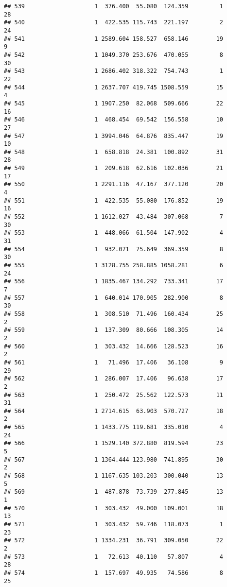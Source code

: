 \documentclass[
]{article}
\begin{document}
\begin{verbatim}
## 539                    1  376.400  55.080  124.359         1        28
## 540                    1  422.535 115.743  221.197         2        24
## 541                    1 2589.604 158.527  658.146        19         9
## 542                    1 1049.370 253.676  470.055         8        30
## 543                    1 2686.402 318.322  754.743         1        22
## 544                    1 2637.707 419.745 1508.559        15         4
## 545                    1 1907.250  82.068  509.666        22        16
## 546                    1  468.454  69.542  156.558        10        27
## 547                    1 3994.046  64.876  835.447        19        10
## 548                    1  658.818  24.381  100.892        31        28
## 549                    1  209.618  62.616  102.036        21        17
## 550                    1 2291.116  47.167  377.120        20         4
## 551                    1  422.535  55.080  176.852        19        16
## 552                    1 1612.027  43.484  307.068         7        30
## 553                    1  448.066  61.504  147.902         4        31
## 554                    1  932.071  75.649  369.359         8        30
## 555                    1 3128.755 258.885 1058.281         6        24
## 556                    1 1835.467 134.292  733.341        17         7
## 557                    1  640.014 170.905  282.900         8        30
## 558                    1  308.510  71.496  160.434        25         2
## 559                    1  137.309  80.666  108.305        14         2
## 560                    1  303.432  14.666  128.523        16         2
## 561                    1   71.496  17.406   36.108         9        29
## 562                    1  286.007  17.406   96.638        17         2
## 563                    1  250.472  25.562  122.573        11        31
## 564                    1 2714.615  63.903  570.727        18         2
## 565                    1 1433.775 119.681  335.010         4        24
## 566                    1 1529.140 372.880  819.594        23         5
## 567                    1 1364.444 123.980  741.895        30         2
## 568                    1 1167.635 103.203  300.040        13         5
## 569                    1  487.878  73.739  277.845        13         1
## 570                    1  303.432  49.000  109.001        18        13
## 571                    1  303.432  59.746  118.073         1        23
## 572                    1 1334.231  36.791  309.050        22         2
## 573                    1   72.613  40.110   57.807         4        28
## 574                    1  157.697  49.935   74.586         8        25

\end{verbatim}
\end{document}
